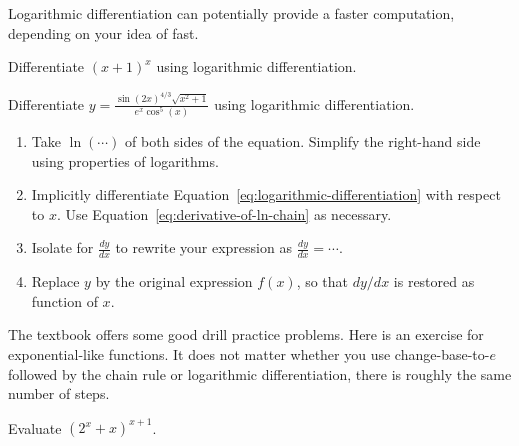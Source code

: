 \documentclass[../main.tex]{subfiles}
\begin{document}
Logarithmic differentiation can potentially provide a faster computation, depending on your idea of fast.

\begin{exercise}
  Differentiate \((x+1)^{x}\) using logarithmic differentiation.

  \blanks*
\end{exercise}
\clearpage

\begin{example} \label{eg:log-diff}
  Differentiate \(y = \frac{\sin(2x)^{4/3} \sqrt{x^{2}+1}}{e^{x} \cos^{5}(x)}\) using logarithmic differentiation.

  \begin{enumerate}
    \item Take \(\ln(\cdots{})\) of both sides of the equation. Simplify the right-hand side using properties of logarithms.

    \item Implicitly differentiate Equation~\eqref{eq:logarithmic-differentiation} with respect to \(x\). Use Equation~\eqref{eq:derivative-of-ln-chain} as necessary.

      \blanks*
      \clearpage

    \item Isolate for \(\frac{dy}{dx}\) to rewrite your expression as \(\frac{dy}{dx} = \cdots\).


    \item Replace \(y\) by the original expression \(f(x)\), so that \(dy/dx\) is restored as function of \(x\).

  \end{enumerate}
\end{example}
\clearpage

The textbook offers some good drill practice problems. Here is an exercise for exponential-like functions. It does not matter whether you use change-base-to-\(e\) followed by the chain rule or logarithmic differentiation, there is roughly the same number of steps.

\begin{exercise}
  Evaluate \((2^{x} + x)^{x+1}\).

  \blanks*
\end{exercise}
\clearpage
\end{document}
